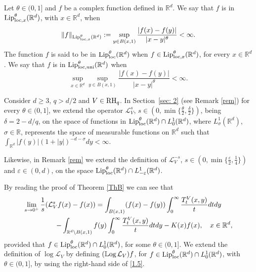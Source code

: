 \documentclass[10pt, a4paper, reqno]{amsart}
\theoremstyle{definition}
\theoremstyle{remark}
\newcommand{\RH}{\textup{RH}}
\numberwithin{equation}{section}
\begin{document}
Let $\theta\in (0,1]$ and $f$ be a complex function defined in $\mathbb{R}^d$. We say that $f$ is in ${\textup{Lip}}_{{\rm loc},x}^\theta(\mathbb{R}^d)$, with $x\in \mathbb{R}^d$, when
\[
\|f\|_{{\textup{Lip}}_{{\rm loc},x}^\theta(\mathbb{R}^d)}:=\sup_{y\in B(x,1)}\frac{|f(x)-f(y)|}{|x-y|^\theta}<\infty.
\]
The function $f$ is said to be in ${\textup{Lip}}^\theta_{\rm loc}(\mathbb{R}^d)$ when $f\in {\textup{Lip}}^\theta_{{\rm loc},x}(\mathbb{R}^d)$, for every $x\in \mathbb{R}^d$.  We say that $f$ is in ${\textup{Lip}}^\theta_{{\rm loc},{\rm uni}}(\mathbb{R}^d)$ when
\[
\sup_{x\in \mathbb{R}^d}\sup_{y\in B(x,1)}\frac{|f(x)-f(y)|}{|x-y|^\theta}<\infty.
\]

Consider $d\geq 3$, $q>d/2$ and $V\in \RH_q$. In Section~\ref{sec: 2} (see Remark \ref{rem}) for every $\theta \in (0,1]$, we extend the operator $\mathcal L_V^s$, $s\in (0,\min\{\frac{\theta }{2},\frac{\delta}{2}\})$, being $\delta =2-d/q$, on the space of functions in ${\textup{Lip}}_{\textup{loc}}^\theta (\mathbb R^d)\cap L^1_0(\mathbb R^d)$, where $L^1_\sigma(\mathbb R^d)$, $\sigma \in \mathbb R$, represents the space of measurable functions on $\mathbb R^d$ such that $\int_{\mathbb R^d}|f(y)|(1+|y|)^{-d-\sigma}dy<\infty$. 

Likewise, in Remark \ref{rem} we extend the definition of $\mathcal L_V^{-s}$, $s\in (0,\min\{\frac{\varepsilon }{2},\frac{1}{4}\})$ and $\varepsilon \in (0,d)$, on the space ${\textup{Lip}}_{\textup{loc}}^\theta (\mathbb R^d)\cap L^1_{-\varepsilon}(\mathbb R^d)$. 

By reading the proof of Theorem \ref{ThB}  we can see that 
\begin{align}\label{1.5}
\lim_{s\rightarrow 0^+}\frac{1}{s}(\mathcal L_V^sf(x)-f(x))&=\int_{B(x,1)}(f(x)-f(y))\int_0^\infty \frac{T_t^V(x,y)}{t}dtdy\nonumber\\
&\hspace{-2cm} {-}\int_{\mathbb R^d\setminus B(x,1)}f(y)\int_0^\infty \frac{T_t^V(x,y)}{t}dtdy-K(x)f(x),\quad x\in \mathbb R^d, 
\end{align}
provided that $f\in {\textup{Lip}}^\theta_{\rm loc} (\mathbb R^d)\cap L^1_0(\mathbb R^d)$, for some $\theta \in (0,1]$. We extend the definition of $\log \mathcal L_V$ by defining $(\mathbb{L}\textup{og}\,\mathcal{L}_V)f$, for $f\in {\textup{Lip}}_{\rm loc}^\theta (\mathbb R^d)\cap L^1_0(\mathbb R^d)$, with $\theta \in (0,1]$, by using the right-hand side of \eqref{1.5}.
\end{document}
